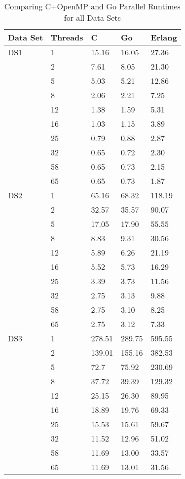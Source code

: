 \documentclass[11pt,a4paper,titlepage]{article}
\begin{document}
\begin{table}[!h]
\centering
\begin{tabular}{|l|l|l|l|l|}
\hline
Data Set & Threads & C & Go & Erlang \\ \hline
DS1 & 1 & 15.16 & 16.05 & 27.36 \\ \cline{2-5} 
 & 2 & 7.61 & 8.05 & 21.30 \\ \cline{2-5} 
 & 5 & 5.03 & 5.21 & 12.86 \\ \cline{2-5} 
 & 8 & 2.06 & 2.21 & 7.25 \\ \cline{2-5} 
 & 12 & 1.38 & 1.59 & 5.31 \\ \cline{2-5} 
 & 16 & 1.03 & 1.15 & 3.89 \\ \cline{2-5} 
 & 25 & 0.79 & 0.88 & 2.87 \\ \cline{2-5} 
 & 32 & 0.65 & 0.72 & 2.30 \\ \cline{2-5} 
 & 58 & 0.65 & 0.73 & 2.15 \\ \cline{2-5} 
 & 65 & 0.65 & 0.73 & 1.87 \\ \hline
DS2 & 1 & 65.16 & 68.32 & 118.19 \\ \cline{2-5} 
 & 2 & 32.57 & 35.57 & 90.07 \\ \cline{2-5} 
 & 5 & 17.05 & 17.90 & 55.55 \\ \cline{2-5} 
 & 8 & 8.83 & 9.31 & 30.56 \\ \cline{2-5} 
 & 12 & 5.89 & 6.26 & 21.19 \\ \cline{2-5} 
 & 16 & 5.52 & 5.73 & 16.29 \\ \cline{2-5} 
 & 25 & 3.39 & 3.73 & 11.56 \\ \cline{2-5} 
 & 32 & 2.75 & 3.13 & 9.88 \\ \cline{2-5} 
 & 58 & 2.75 & 3.10 & 8.25 \\ \cline{2-5} 
 & 65 & 2.75 & 3.12 & 7.33 \\ \hline
DS3 & 1 & 278.51 & 289.75 & 595.55 \\ \cline{2-5} 
 & 2 & 139.01 & 155.16 & 382.53 \\ \cline{2-5} 
 & 5 & 72.7 & 75.92 & 230.69 \\ \cline{2-5} 
 & 8 & 37.72 & 39.39 & 129.32 \\ \cline{2-5} 
 & 12 & 25.15 & 26.30 & 89.95 \\ \cline{2-5} 
 & 16 & 18.89 & 19.76 & 69.33 \\ \cline{2-5} 
 & 25 & 15.53 & 15.61 & 59.67 \\ \cline{2-5} 
 & 32 & 11.52 & 12.96 & 51.02 \\ \cline{2-5} 
 & 58 & 11.69 & 13.00 & 33.57 \\ \cline{2-5} 
 & 65 & 11.69 & 13.01 & 31.56 \\ \hline
\end{tabular}
\caption{Comparing C+OpenMP and Go Parallel Runtimes for all Data Sets}
\end{table}
\end{document}
